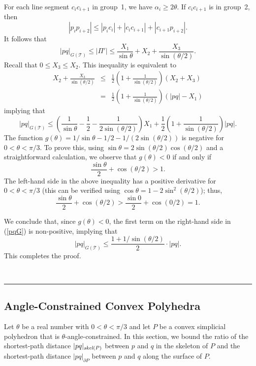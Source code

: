 \documentclass[12pt]{article}
\newcommand{\skel}{\mathord{\it skel}}
\newcommand{\qed}{\rule{0.5em}{1.5ex}}
\newcommand{\fqed}{{\hfill~\qed}}
\newenvironment{proof}{{\noindent \bf Proof.}}
                      {{\hfill \fqed} \vspace{1em}}
\begin{document}
\begin{proof}
For each line segment $c_i c_{i+1}$ in group~1, we have 
$\alpha_i \geq 2 \theta$. If $c_i c_{i+1}$ is in group~2, then 
\[ |p_i p_{i+2} | \leq |p_i c_i| + |c_i c_{i+1}| + |c_{i+1} p_{i+2}| . 
\] 
It follows that 
\[ |pq|_{G(\mathcal{T})} \leq | \Pi' | \leq  
     \frac{X_1}{\sin\theta} + X_2 + \frac{X_3}{\sin(\theta/2)} .
\] 
Recall that $0 \leq X_3 \leq X_2$. This inequality is equivalent to 
\begin{eqnarray*} 
  X_2 + \frac{X_3}{\sin(\theta/2)} & \leq & 
        \frac{1}{2} 
        \left( 1 + \frac{1}{\sin(\theta/2)} \right) 
        \left( X_2+X_3 \right) \\ 
        & = & \frac{1}{2} 
              \left( 1 + \frac{1}{\sin(\theta/2)} \right) 
              \left( |pq| - X_1 \right) 
\end{eqnarray*} 
implying that 
\begin{equation}  \label{pqG} 
 |pq|_{G(\mathcal{T})} \leq 
    \left( \frac{1}{\sin\theta} - \frac{1}{2} - 
           \frac{1}{2\sin(\theta/2)} 
    \right) X_1 + 
        \frac{1}{2} \left( 1 + \frac{1}{\sin(\theta/2)} \right) |pq| . 
\end{equation} 
The function $g(\theta) = 1/\sin\theta - 1/2 - 1/(2\sin(\theta/2))$ 
is negative for $0 < \theta < \pi/3$. To prove this, using 
$\sin\theta = 2 \sin(\theta/2) \cos(\theta/2)$ and a straightforward 
calculation, we observe that $g(\theta) < 0$ if and only if 
\[ \frac{\sin\theta}{2} + \cos(\theta/2) > 1 . 
\] 
The left-hand side in the above inequality has a positive derivative 
for $0 < \theta < \pi/3$ (this can be verified using 
$\cos\theta = 1 - 2 \sin^2(\theta/2)$); thus, 
\[ \frac{\sin\theta}{2} + \cos(\theta/2) >  
   \frac{\sin 0}{2} + \cos(0/2) = 1 . 
\] 

We conclude that, since $g(\theta)<0$, the first term on the right-hand 
side in (\ref{pqG}) is non-positive, implying that 
\[ |pq|_{G(\mathcal{T})} \leq 
     \frac{1+1/\sin(\theta/2)}{2} \cdot |pq| . 
\] 
This completes the proof.  
\end{proof} 


\subsection{Angle-Constrained Convex Polyhedra}   
Let $\theta$ be a real number with $0 < \theta < \pi/3$ and let $P$ be 
a convex simplicial polyhedron that is $\theta$-angle-constrained. In 
this section, we bound the ratio of the shortest-path distance 
$|pq|_{\skel(P)}$ between $p$ and $q$ in the skeleton of $P$ and the 
shortest-path distance $|pq|_{\partial P}$ between $p$ and $q$ along 
the surface of $P$.  
\end{document}
